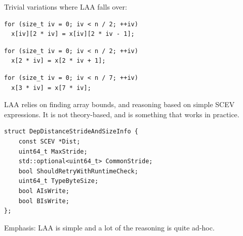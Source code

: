 \documentclass{beamer}
\begin{document}
\begin{frame}[containsverbatim]
  Trivial variations where LAA falls over:

  \vspace{1em}

  \begin{verbatim}
for (size_t iv = 0; iv < n / 2; ++iv)
  x[iv][2 * iv] = x[iv][2 * iv - 1];
  \end{verbatim}

  \vspace{1em}

  \begin{verbatim}
for (size_t iv = 0; iv < n / 2; ++iv)
  x[2 * iv] = x[2 * iv + 1];
  \end{verbatim}

  \vspace{1em}

  \begin{verbatim}
for (size_t iv = 0; iv < n / 7; ++iv)
  x[3 * iv] = x[7 * iv];
  \end{verbatim}

  \vspace{1em}

  LAA relies on finding array bounds, and reasoning based on simple SCEV expressions. It is not theory-based, and is something that works in practice.
\end{frame}

\begin{frame}[containsverbatim]
  \begin{verbatim}
struct DepDistanceStrideAndSizeInfo {
    const SCEV *Dist;
    uint64_t MaxStride;
    std::optional<uint64_t> CommonStride;
    bool ShouldRetryWithRuntimeCheck;
    uint64_t TypeByteSize;
    bool AIsWrite;
    bool BIsWrite;
};
  \end{verbatim}

  \vspace{1em}

  Emphasis: LAA is simple and a lot of the reasoning is quite ad-hoc.
\end{frame}
\end{document}
